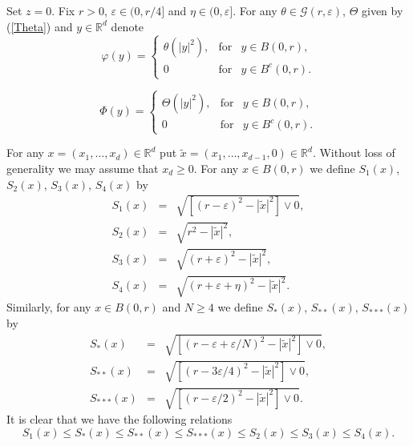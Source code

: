 \documentclass[a4paper,12pt,reqno]{amsart}
\theoremstyle{definition}
\theoremstyle{remark}
\newcommand{\eps}{\varepsilon}
\newcommand{\calG}{\mathcal{G}}
\newcommand{\R}{\mathds{R}}
\begin{document}
Set $z = 0$. Fix $r > 0$, $\eps \in (0,r/4]$ and $\eta \in (0,\eps]$. 
For any $\theta \in \calG(r,\eps)$, $\Theta$ given by (\ref{Theta}) and $y \in \R^d$ denote
\begin{equation*}
\varphi(y) =  \left\{              
\begin{array}{lll}                   
\theta(|y|^2),&\text{for}& y \in B(0,r), \\  
0 &\text{for}& y \in B^c(0,r).
\end{array}
\right. 
\end{equation*}

\begin{equation*}
\varPhi(y) =  \left\{              
\begin{array}{lll}                   
\Theta(|y|^2),&\text{for}& y \in B(0,r), \\  
0 &\text{for}& y \in B^c(0,r).
\end{array}
\right. 
\end{equation*}

For any $x = (x_1, \ldots, x_d) \in \R^d$ put $\tilde{x} = (x_1, \ldots, x_{d-1},0) \in \R^{d}$. Without loss of generality we may assume that $x_d \ge 0$. 
For any $x \in B(0,r)$ we define $S_1(x)$, $S_2(x)$, $S_3(x)$, $S_4(x)$  by
\begin{eqnarray*}
S_1(x) &=& \sqrt{[(r - \eps)^2 - |\tilde{x}|^2] \vee 0},\\
S_2(x) &=& \sqrt{r^2 - |\tilde{x}|^2},\\
S_3(x) &=& \sqrt{(r + \eps)^2 - |\tilde{x}|^2},\\
S_4(x) &=& \sqrt{(r + \eps + \eta)^2 - |\tilde{x}|^2}.
\end{eqnarray*}
Similarly, for any $x \in B(0,r)$ and $N \ge 4$ we define $S_*(x)$, $S_{**}(x)$, $S_{***}(x)$ by
\begin{eqnarray*}
S_{*}(x) &=& \sqrt{[(r - \eps + \eps/N)^2 - |\tilde{x}|^2] \vee 0},\\
S_{**}(x) &=  & \sqrt{[(r - 3\eps/4)^2 - |\tilde{x}|^2] \vee 0},\\
S_{***}(x) &=& \sqrt{[(r - \eps/2)^2 - |\tilde{x}|^2] \vee 0}.
\end{eqnarray*} 
It is clear that we have the following relations 
$$S_1(x)\le  S_{*}(x) \le S_{**}(x) \le S_{***}(x) \le S_2(x)\le S_3(x)\le S_4(x).$$
\end{document}
